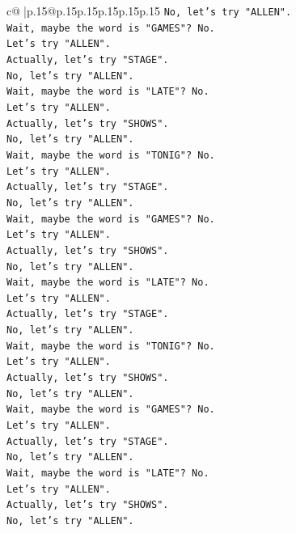 \documentclass{article}
\begin{document}
{\begin{supertabular}{c@{$\;$}|p{.15\linewidth}@{}p{.15\linewidth}p{.15\linewidth}p{.15\linewidth}p{.15\linewidth}p{.15\linewidth}}
{{{\texttt{No, let's try "ALLEN".} \\
\texttt{Wait, maybe the word is "GAMES"? No.} \\
\texttt{Let's try "ALLEN".} \\
\texttt{Actually, let's try "STAGE".} \\
\texttt{No, let's try "ALLEN".} \\
\texttt{Wait, maybe the word is "LATE"? No.} \\
\texttt{Let's try "ALLEN".} \\
\texttt{Actually, let's try "SHOWS".} \\
\texttt{No, let's try "ALLEN".} \\
\texttt{Wait, maybe the word is "TONIG"? No.} \\
\texttt{Let's try "ALLEN".} \\
\texttt{Actually, let's try "STAGE".} \\
\texttt{No, let's try "ALLEN".} \\
\texttt{Wait, maybe the word is "GAMES"? No.} \\
\texttt{Let's try "ALLEN".} \\
\texttt{Actually, let's try "SHOWS".} \\
\texttt{No, let's try "ALLEN".} \\
\texttt{Wait, maybe the word is "LATE"? No.} \\
\texttt{Let's try "ALLEN".} \\
\texttt{Actually, let's try "STAGE".} \\
\texttt{No, let's try "ALLEN".} \\
\texttt{Wait, maybe the word is "TONIG"? No.} \\
\texttt{Let's try "ALLEN".} \\
\texttt{Actually, let's try "SHOWS".} \\
\texttt{No, let's try "ALLEN".} \\
\texttt{Wait, maybe the word is "GAMES"? No.} \\
\texttt{Let's try "ALLEN".} \\
\texttt{Actually, let's try "STAGE".} \\
\texttt{No, let's try "ALLEN".} \\
\texttt{Wait, maybe the word is "LATE"? No.} \\
\texttt{Let's try "ALLEN".} \\
\texttt{Actually, let's try "SHOWS".} \\
\texttt{No, let's try "ALLEN".} \\
}}}
\end{supertabular}}
\end{document}
